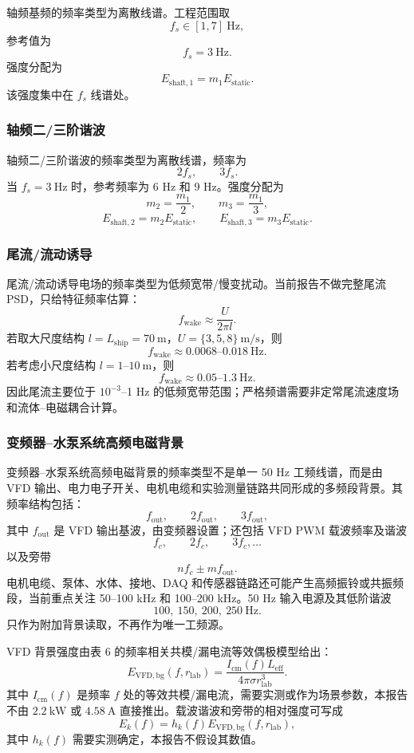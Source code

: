 轴频基频的频率类型为离散线谱。工程范围取
\[
f_s\in[1,7]\ \mathrm{Hz},
\]
参考值为
\[
f_s=3\ \mathrm{Hz}.
\]
强度分配为
\[
E_{\mathrm{shaft},1}=m_1E_{\mathrm{static}}.
\]
该强度集中在 $f_s$ 线谱处。

\subsubsection*{轴频二/三阶谐波}

轴频二/三阶谐波的频率类型为离散线谱，频率为
\[
2f_s,\qquad 3f_s.
\]
当 $f_s=3\ \mathrm{Hz}$ 时，参考频率为 6 Hz 和 9 Hz。强度分配为
\[
m_2=\frac{m_1}{2},\qquad m_3=\frac{m_1}{3},
\]
\[
E_{\mathrm{shaft},2}=m_2E_{\mathrm{static}},\qquad
E_{\mathrm{shaft},3}=m_3E_{\mathrm{static}}.
\]

\subsubsection*{尾流/流动诱导}

尾流/流动诱导电场的频率类型为低频宽带/慢变扰动。当前报告不做完整尾流 PSD，只给特征频率估算：
\[
f_{\mathrm{wake}}\approx\frac{U}{2\pi l}.
\]
若取大尺度结构 $l=L_{\mathrm{ship}}=70\ \mathrm{m}$，$U=\{3,5,8\}\ \mathrm{m/s}$，则
\[
f_{\mathrm{wake}}\approx0.0068\text{--}0.018\ \mathrm{Hz}.
\]
若考虑小尺度结构 $l=1\text{--}10\ \mathrm{m}$，则
\[
f_{\mathrm{wake}}\approx0.05\text{--}1.3\ \mathrm{Hz}.
\]
因此尾流主要位于 $10^{-3}$--1 Hz 的低频宽带范围；严格频谱需要非定常尾流速度场和流体--电磁耦合计算。

\subsubsection*{变频器--水泵系统高频电磁背景}

变频器--水泵系统高频电磁背景的频率类型不是单一 50 Hz 工频线谱，而是由 VFD 输出、电力电子开关、电机电缆和实验测量链路共同形成的多频段背景。其频率结构包括：
\[
f_{\mathrm{out}},\qquad 2f_{\mathrm{out}},\qquad 3f_{\mathrm{out}},
\]
其中 $f_{\mathrm{out}}$ 是 VFD 输出基波，由变频器设置；还包括 VFD PWM 载波频率及谐波
\[
f_c,\qquad 2f_c,\qquad 3f_c,\ldots
\]
以及旁带
\[
nf_c\pm mf_{\mathrm{out}}.
\]
电机电缆、泵体、水体、接地、DAQ 和传感器链路还可能产生高频振铃或共振频段，当前重点关注 50--100 kHz 和 100--200 kHz。50 Hz 输入电源及其低阶谐波
\[
100,\ 150,\ 200,\ 250\ \mathrm{Hz}.
\]
只作为附加背景读取，不再作为唯一工频源。

VFD 背景强度由表 6 的频率相关共模/漏电流等效偶极模型给出：
\[
E_{\mathrm{VFD,bg}}(f,r_{\mathrm{lab}})=
\frac{I_{\mathrm{cm}}(f)L_{\mathrm{eff}}}{4\pi\sigma r_{\mathrm{lab}}^3}.
\]
其中 $I_{\mathrm{cm}}(f)$ 是频率 $f$ 处的等效共模/漏电流，需要实测或作为场景参数，本报告不由 $2.2\ \mathrm{kW}$ 或 $4.58\ \mathrm{A}$ 直接推出。载波谐波和旁带的相对强度可写成
\[
E_k(f)=h_k(f)E_{\mathrm{VFD,bg}}(f,r_{\mathrm{lab}}),
\]
其中 $h_k(f)$ 需要实测确定，本报告不假设其数值。

